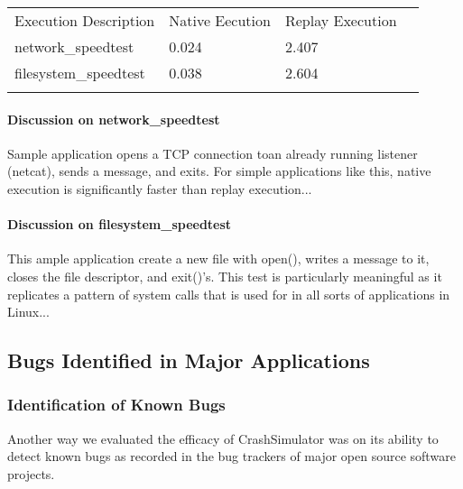             \begin{table}[H]
                \scriptsize{}
                \begin{tabular}{l  l  l  l}
                    \toprule{}
                        Execution Description & Native Eecution & Replay Execution\\
                        network\_speedtest & 0.024 & 2.407 \\
                        filesystem\_speedtest & 0.038 & 2.604 \\
                    \bottomrule{}
                \end{tabular}
            \end{table}

        \paragraph{Discussion on network\_speedtest}

        Sample application opens a TCP connection toan already running listener (netcat), sends a message, and
        exits. For simple applications like this, native execution is significantly faster than replay execution...

        \paragraph{Discussion on filesystem\_speedtest}

        This ample application create a new file with open(), writes a message to it, closes the file descriptor, and
        exit()'s. This test is particularly meaningful as it replicates a pattern of system calls that is used for in
        all sorts of applications in Linux...
            
    \subsection{Bugs Identified in Major Applications}

        \subsubsection{Identification of Known Bugs}

        Another way we evaluated the efficacy of CrashSimulator was on its ability to detect known bugs as recorded in
        the bug trackers of major open source software projects.

